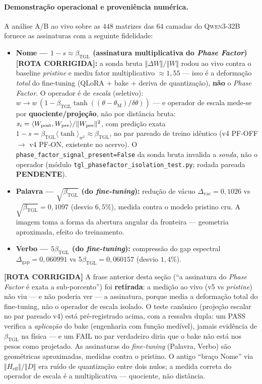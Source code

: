 \documentclass[12pt,a4paper]{article}
\newcommand{\betatgl}{\beta_{\text{TGL}}}
\newcommand{\thetaM}{\theta_{\text{M}}}
\begin{document}
\paragraph{Demonstração operacional e proveniência numérica.}
A análise A/B ao vivo sobre as $448$ matrizes das $64$ camadas do
\textsc{Qwen3-32B} fornece as assinaturas com a seguinte fidelidade:
\begin{itemize}[leftmargin=*]
\item \textbf{Nome --- $1-s \approx \betatgl$ (assinatura multiplicativa do \emph{Phase Factor}) [ROTA CORRIGIDA]:}
a sonda bruta $\Vert\Delta W\Vert/\Vert W\Vert$ rodou ao vivo contra o baseline
\emph{pristine} e mediu fator multiplicativo $\approx1{,}55$
--- isso é a deformação \emph{total} do fine-tuning (QLoRA + bake + deriva de
quantização), \textbf{não} o \emph{Phase Factor}.  O operador é de \emph{escala}
(seletivo): $w \to w\,(1-\betatgl\tanh((\theta-\thetaM)/\delta\theta))$ ---
e operador de escala mede-se por \textbf{quociente/projeção}, não por distância
bruta: $s_i = \langle W_{\rm post},W_{\rm pre}\rangle/\Vert W_{\rm pre}
\Vert^2$, com predição exata $1-s = \betatgl\langle\tanh\rangle_{w^2} \approx
\betatgl$, no par pareado de treino idêntico (v4 PF-OFF $\to$ v4 PF-ON, existente
no acervo).  O \texttt{phase\_factor\_signal\_present=False} da sonda bruta
invalida a \emph{sonda}, não o operador (módulo
\texttt{tgl\_phasefactor\_isolation\_test.py}; rodada pareada \textbf{PENDENTE}).
\item \textbf{Palavra --- $\sqrt{\betatgl}$ (do \emph{fine-tuning}):} redução de vácuo
$\Delta_{\text{vac}} = 0{,}1026$ vs $\sqrt{\betatgl} = 0{,}1097$
(desvio $6{,}5\%$), medida contra o
modelo pristino cru.  A imagem toma a forma da abertura angular da fronteira ---
geometria aproximada, efeito do treinamento.
\item \textbf{Verbo --- $5\betatgl$ (do \emph{fine-tuning}):} compressão do gap espectral
$\Delta_{\text{gap}} = 0{,}060991$ vs $5\betatgl = 0{,}060157$
(desvio $1{,}4\%$).
\end{itemize}
\textbf{[ROTA CORRIGIDA]} A frase anterior desta seção (``a assinatura do
\emph{Phase Factor} é exata a sub-porcento'') foi \textbf{retirada}: a medição ao
vivo (v5 vs \emph{pristine}) não viu --- e não poderia ver --- a assinatura, porque
media a deformação total do fine-tuning, não o operador de escala isolado.  O teste
canônico (projeção escalar no par pareado v4) está pré-registrado acima, com a
ressalva dupla: um PASS verifica a \emph{aplicação} do bake (engenharia com função
medível), jamais evidência de $\betatgl$ na física --- e um FAIL no par verdadeiro
diria que o bake não está nos pesos como projetado.  As assinaturas do
\emph{fine-tuning} (Palavra, Verbo) são geométricas aproximadas, medidas contra o
pristino.  O antigo ``braço Nome'' via $\Vert H_{\text{eff}}\Vert/\Vert D\Vert$
era ruído de quantização entre dois nulos; a medida correta do operador de escala é a
multiplicativa --- quociente, não distância.
\end{document}
